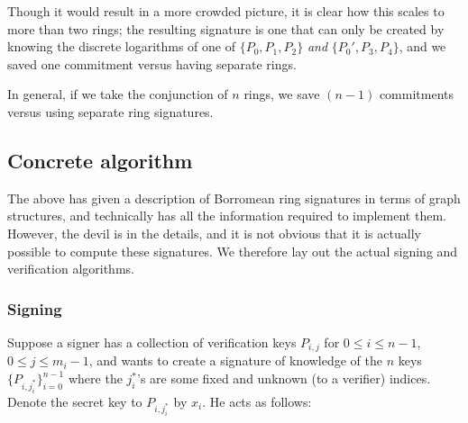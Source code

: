 \documentclass[letterpaper]{article}
\begin{document}
Though it would result in a more crowded picture, it is clear how this scales
to more than two rings; the resulting signature is one that can only be created
by knowing the discrete logarithms of one of $\{P_0, P_1, P_2\}$ \emph{and}
$\{P_0', P_3, P_4\}$, and we saved one commitment versus having separate rings.

In general, if we take the conjunction of $n$ rings, we save $(n-1)$ commitments
versus using separate ring signatures.

\subsection{Concrete algorithm}

The above has given a description of Borromean ring signatures in terms of graph
structures, and technically has all the information required to implement them.
However, the devil is in the details, and it is not obvious that it is
actually possible to compute these signatures. We therefore lay out the actual
signing and verification algorithms.

\subsubsection{Signing}

Suppose a signer has a collection of verification keys $P_{i,j}$ for
$0\leq i\leq n-1$, $0\leq j\leq m_i-1$, and wants to create a signature
of knowledge of the $n$ keys $\{P_{i,j^*_i}\}_{i=0}^{n-1}$ where the
$j^*_i$'s are some fixed and unknown (to a verifier) indices. Denote the
secret key to $P_{i,j^*_i}$ by $x_i$. He acts as follows:
\end{document}
